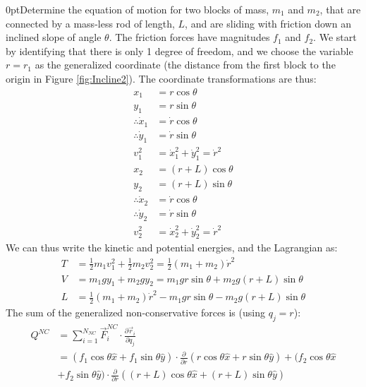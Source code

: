 \begin{example}{0pt}{Determine the equation of motion for two blocks of mass, $m_1$ and $m_2$, that are connected by a mass-less rod of length, $L$, and are sliding with friction down an inclined slope of angle $\theta$. The friction forces have magnitudes $f_1$ and $f_2$.}{}
We start by identifying that there is only 1 degree of freedom, and we choose the variable $r=r_1$ as the generalized coordinate (the distance from the first block to the origin in Figure \ref{fig:Incline2}). The coordinate transformations are thus:
\begin{align*}
x_1&=r\cos{\theta}\nonumber\\
y_1&=r\sin{\theta}\nonumber\\
\therefore\dot{x}_1&=\dot{r}\cos{\theta}\nonumber\\
\therefore\dot{y}_1&=\dot{r}\sin{\theta}\nonumber\\
v_1^2&=\dot{x}_1^2+\dot{y}_1^2=\dot{r}^2\\
x_2&=(r+L)\cos{\theta}\nonumber\\
y_2&=(r+L)\sin{\theta}\nonumber\\
\therefore\dot{x}_2&=\dot{r}\cos{\theta}\nonumber\\
\therefore\dot{y}_2&=\dot{r}\sin{\theta}\nonumber\\
v_2^2&=\dot{x}_2^2+\dot{y}_2^2=\dot{r}^2
\end{align*}
We can thus write the kinetic and potential energies, and the Lagrangian as:
\begin{align*}
T&=\frac{1}{2}m_1v_1^2+\frac{1}{2}m_2v_2^2=\frac{1}{2}(m_1+m_2)\dot{r}^2\nonumber\\
V&=m_1gy_1+m_2gy_2=m_1gr\sin{\theta}+m_2g(r+L)\sin{\theta}\nonumber\\
L&=\frac{1}{2}(m_1+m_2)\dot{r}^2-m_1gr\sin{\theta}-m_2g(r+L)\sin{\theta}
\end{align*}
The sum of the generalized non-conservative forces is (using $q_j=r$):
\begin{align*}
Q^{NC}&=\sum_{i=1}^{N_{NC}}\vec{F}_i^{NC}\cdot\frac{\partial\vec{r}_i}{\partial q_j}\nonumber\\
&=(f_1\cos{\theta}\hat{x}+f_1\sin{\theta}\hat{y})\cdot\frac{\partial}{\partial r} (r\cos{\theta}\hat{x}+r\sin{\theta}\hat{y})+(f_2\cos{\theta}\hat{x}\\
&+f_2\sin{\theta}\hat{y})\cdot\frac{\partial}{\partial r} ((r+L)\cos{\theta}\hat{x}+(r+L)\sin{\theta}\hat{y})\nonumber\\

\end{align*}
\end{example}
